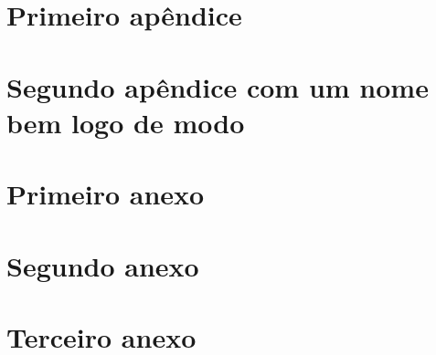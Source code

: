 \documentclass[12pt,openright,twoside,a4paper]{abntex2}
\begin{document}
\lipsum[31-33]






%
%


\begin{apendicesenv}

\appendixpage

\chapter{Primeiro apêndice}

\lipsum[50-52]

\chapter{Segundo apêndice com um nome bem logo de modo}
\lipsum[55-57]
\end{apendicesenv}


\begin{anexosenv}
% 

\appendixpage

\chapter{Primeiro anexo}
\lipsum[200-202]

\chapter{Segundo anexo}

\lipsum[210-212]

\chapter{Terceiro anexo}

\lipsum[213-214]

\end{anexosenv}



\printindex
\end{document}
